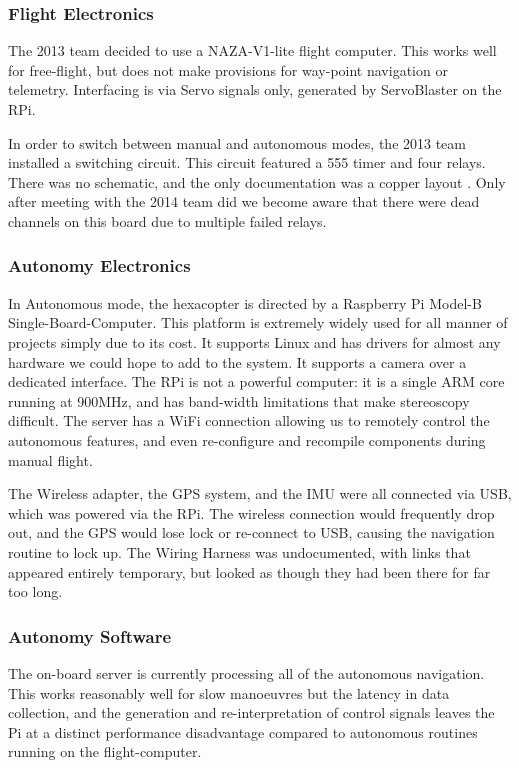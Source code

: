 \documentclass[a4paper, 11pt, titlepage]{article}
\begin{document}
    \subsubsection{Flight Electronics}
      The 2013 team  decided to use a NAZA-V1-lite flight computer.  This works well for free-flight, but does not make provisions for way-point navigation or telemetry.  Interfacing is via Servo signals only, generated by ServoBlaster \cite{ServoBlaster} on the RPi.

      In order to switch between manual and autonomous modes, the 2013 team installed a switching circuit. This circuit featured a 555 timer and four relays.
      There was no schematic, and the only documentation was a copper layout \cite[p. 27-28]{OConnor}.  Only after meeting with the 2014 team did we become aware that there were dead channels on this board due to multiple failed relays.

    \subsubsection{Autonomy Electronics}
      In Autonomous mode, the hexacopter is directed by a Raspberry Pi Model-B Single-Board-Computer.
      This platform is extremely widely used for all manner of projects simply due to its cost.
      It supports Linux and has drivers for almost any hardware we could hope to add to the system. It supports a camera over a dedicated interface.
      The RPi is not a powerful computer: it is a single ARM core running at 900MHz, and has band-width limitations that make stereoscopy difficult.
      The server has a WiFi connection allowing us to remotely control the autonomous features, and even re-configure and recompile components during manual flight.

      The Wireless adapter, the GPS system, and the IMU were all connected via USB, which was powered via the RPi.  The wireless connection would frequently drop out, and the GPS would lose lock or re-connect to USB, causing the navigation routine to lock up.
      The Wiring Harness was undocumented, with links that appeared entirely temporary, but looked as though they had been there for far too long.

    \subsubsection{Autonomy Software}
      The on-board server is currently processing all of the autonomous navigation.  This works reasonably well for slow manoeuvres but the latency in data collection, and the generation and re-interpretation of control signals leaves the Pi at a distinct performance disadvantage compared to autonomous routines running on the flight-computer.
\end{document}
